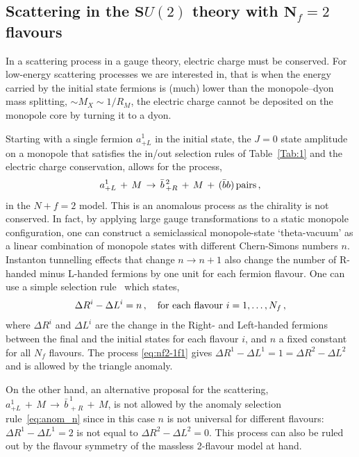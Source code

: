 \documentclass[a4paper,11pt]{article}
\begin{document}
\subsection{Scattering in the $\mathbf SU(2)$ theory with $\mathbf N_f=2$ flavours}
\label{sec:2.2}
\medskip

In a scattering process in a gauge theory, electric charge must be conserved. For low-energy scattering processes we are interested in, that is when the energy carried by the initial state fermions is (much) lower than the monopole--dyon mass splitting, $\sim M_X \sim 1/R_M$, the electric charge cannot be deposited on the monopole core by turning it to a dyon.

Starting with a single fermion $a_{+L}^1$  in the initial state, the $J=0$ state amplitude on a monopole that satisfies the in/out selection rules of Table~\ref{Tab:1} and the electric charge conservation, allows for the process,
\begin{equation}
\label{eq:nf2-1f1}
 a_{+L}^1 \,+\, M \,\to\, \bar{b}_{\,+R}^{\,2} \,+\, M \,+\, (\bar{b}b)\,{\rm pairs} \,,
\end{equation}
in the $N+f=2$ model.
This is an anomalous process as the chirality is not conserved. In fact, by applying large gauge transformations to a static monopole configuration, one can construct a semiclassical monopole-state `theta-vacuum' as a linear combination of monopole states with different Chern-Simons numbers $n$. Instanton tunnelling effects that change $n\to n+1$ also change the number of R-handed minus L-handed fermions by one unit for each fermion flavour.
One can use a simple selection rule~\cite{Rubakov:1988aq} which states,
\begin{equation}
\label{eq:anom_n}
\Delta R^i - \Delta L^i = n \,,\quad {\rm for\,\,each\,\,flavour\,\, } i=1,\ldots,N_f \,,
\end{equation}
where $\Delta R^i$ and $\Delta L^i$ are the change in the Right- and Left-handed fermions between the final and the initial states for each flavour $i$, and $n$ a fixed constant for all $N_f$ flavours.
The process \eqref{eq:nf2-1f1} gives $\Delta R^1 - \Delta L^1 = 1 = \Delta R^2 - \Delta L^2$ and is allowed by the triangle anomaly. 

On the other hand, an alternative proposal for the scattering,  $a_{+L}^1 \,+\, M \,\to\, \bar{b}_{\,+R}^{\,1} \,+\, M$, is not allowed by the anomaly selection rule~\eqref{eq:anom_n} since in this case $n$ is not universal for different flavours:
$\Delta R^1 - \Delta L^1 = 2$ is not equal to $\Delta R^2 - \Delta L^2 = 0$. This process can also be ruled out by the flavour symmetry of the massless 2-flavour model at hand.
 
\end{document}

